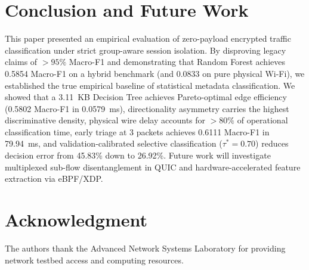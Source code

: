 \documentclass[conference]{IEEEtran}
\begin{document}
\section{Conclusion and Future Work}
\label{sec:conclusion}

This paper presented an empirical evaluation of zero-payload encrypted traffic classification under strict group-aware session isolation. By disproving legacy claims of $>95\%$ Macro-F1 and demonstrating that Random Forest achieves 0.5854 Macro-F1 on a hybrid benchmark (and 0.0833 on pure physical Wi-Fi), we established the true empirical baseline of statistical metadata classification. We showed that a 3.11~KB Decision Tree achieves Pareto-optimal edge efficiency (0.5802 Macro-F1 in 0.0579~ms), directionality asymmetry carries the highest discriminative density, physical wire delay accounts for $>80\%$ of operational classification time, early triage at 3 packets achieves 0.6111 Macro-F1 in 79.94~ms, and validation-calibrated selective classification ($\tau^* = 0.70$) reduces decision error from 45.83\% down to 26.92\%. Future work will investigate multiplexed sub-flow disentanglement in QUIC and hardware-accelerated feature extraction via eBPF/XDP.

\section*{Acknowledgment}
The authors thank the Advanced Network Systems Laboratory for providing network testbed access and computing resources.



\end{document}
